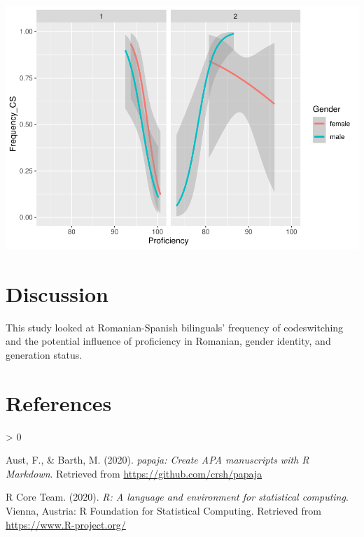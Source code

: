 \documentclass[
  english,
  man]{apa6}
\newlength{\cslhangindent}
\newenvironment{CSLReferences}[2] %
 {%
  \setlength{\parindent}{0pt}
  \ifodd #1 \everypar{\setlength{\hangindent}{\cslhangindent}}\ignorespaces\fi
  \ifnum #2 > 0
  \setlength{\parskip}{#2\baselineskip}
  \fi
 }%
 {}
\begin{document}
\includegraphics{Manuscript_files/figure-latex/unnamed-chunk-2-1.pdf}

\hypertarget{discussion}{%
\section{Discussion}\label{discussion}}

This study looked at Romanian-Spanish bilinguals' frequency of codeswitching and the potential influence of proficiency in Romanian, gender identity, and generation status.

\newpage

\hypertarget{references}{%
\section{References}\label{references}}

\begingroup
\setlength{\parindent}{-0.5in}
\setlength{\leftskip}{0.5in}

\hypertarget{refs}{}
\begin{CSLReferences}{1}{0}
\leavevmode\hypertarget{ref-R-papaja}{}%
Aust, F., \& Barth, M. (2020). \emph{{papaja}: {Create} {APA} manuscripts with {R Markdown}}. Retrieved from \url{https://github.com/crsh/papaja}

\leavevmode\hypertarget{ref-R-base}{}%
R Core Team. (2020). \emph{R: A language and environment for statistical computing}. Vienna, Austria: R Foundation for Statistical Computing. Retrieved from \url{https://www.R-project.org/}

\end{CSLReferences}

\endgroup
\end{document}
